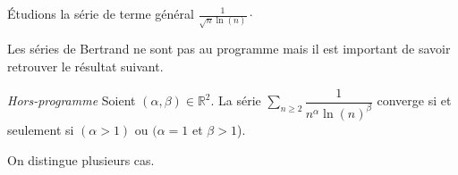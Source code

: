 \documentclass[french,11pt,twoside]{VcCours}
\newcommand{\Sum}[2]{\ensuremath{\textstyle{\sum\limits_{#1}^{#2}}}}
\begin{document}
\begin{Exemple} Étudions la série de terme général $\frac{1}{\sqrt{n} \ln(n)}\cdot$

\vspace{3cm}
\end{Exemple}





Les séries de Bertrand ne sont pas au programme mais il est important de savoir retrouver le résultat suivant.

\begin{Proposition}{\emph{Hors-programme}} 
Soient $(\alpha, \beta) \in \mathbb{R}^2$. La série $\Sum{n \geq 2}{} \dfrac{1}{n^{\alpha} \ln(n)^{\beta}}$ converge si et seulement si $(\alpha > 1)$ ou $(\alpha = 1$ et $\beta >1$).
\end{Proposition}

\begin{Demonstration}{} On distingue plusieurs cas.

\vspace*{10.5cm}

\end{Demonstration}
\end{document}
